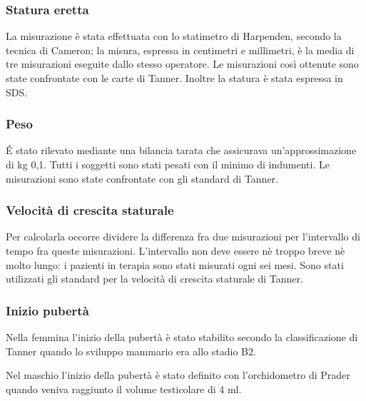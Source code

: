 \subsubsection*{Statura eretta}
 La misurazione è stata effettuata con lo statimetro di Harpenden, secondo la tecnica di Cameron\cite{cameron1984measurement}; la misura, espressa in centimetri e millimetri, è la media di tre misurazioni eseguite dallo stesso operatore. Le misurazioni così ottenute sono state confrontate con le carte di Tanner\cite{tanner1966standards}.
Inoltre la statura è stata espressa in SDS.

  
\subsubsection*{Peso}
 \'E stato rilevato mediante una bilancia tarata che assicurava un'approssimazione di kg 0,1. Tutti i soggetti sono stati pesati con il minimo di indumenti. Le misurazioni sono state confrontate con gli standard di Tanner\cite{tanner1966standards}. 

\subsubsection*{Velocità di crescita staturale}
Per calcolarla occorre dividere la differenza fra due misurazioni per l'intervallo di tempo fra queste misurazioni. L'intervallo non deve essere nè troppo breve nè molto lungo: i pazienti in terapia sono stati misurati ogni sei mesi. Sono stati utilizzati gli standard per la velocità di crescita staturale di Tanner\cite{tanner1966standards}.

\subsubsection*{Inizio pubertà}
Nella femmina l'inizio della pubertà è stato stabilito secondo la classificazione di Tanner\cite{tanner1990foetus} quando lo sviluppo mammario era allo stadio B2.

Nel maschio l'inizio della pubertà è stato definito con l'orchidometro di Prader quando veniva raggiunto il volume testicolare di 4 ml.


